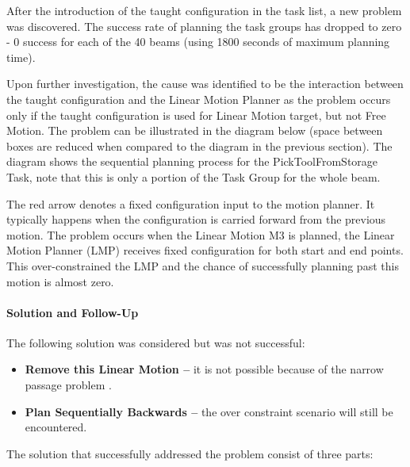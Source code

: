 After the introduction of the taught configuration in the task list, a new problem was discovered. The success rate of planning the task groups has dropped to zero - 0 success for each of the 40 beams (using 1800 seconds of maximum planning time).

Upon further investigation, the cause was identified to be the interaction between the taught configuration and the Linear Motion Planner as the problem occurs only if the taught configuration is used for Linear Motion target, but not Free Motion. The problem can be illustrated in the diagram below (space between boxes are reduced when compared to the diagram in the previous section). The diagram shows the sequential planning process for the PickToolFromStorage Task, note that this is only a portion of the Task Group for the whole beam. 

The red arrow denotes a fixed configuration input to the motion planner. It typically happens when the configuration is carried forward from the previous motion. The problem occurs when the Linear Motion M3 is planned, the Linear Motion Planner (LMP) receives fixed configuration for both start and end points. This over-constrained the LMP and the chance of successfully planning past this motion is almost zero.




\paragraph{Solution and Follow-Up}

The following solution was considered but was not successful:

\begin{itemize}
	\item \textbf{Remove this Linear Motion --} it is not possible because of the narrow passage problem . 

	\item \textbf{Plan Sequentially Backwards --} the over constraint scenario will still be encountered.

\end{itemize}
The solution that successfully addressed the problem consist of three parts:

